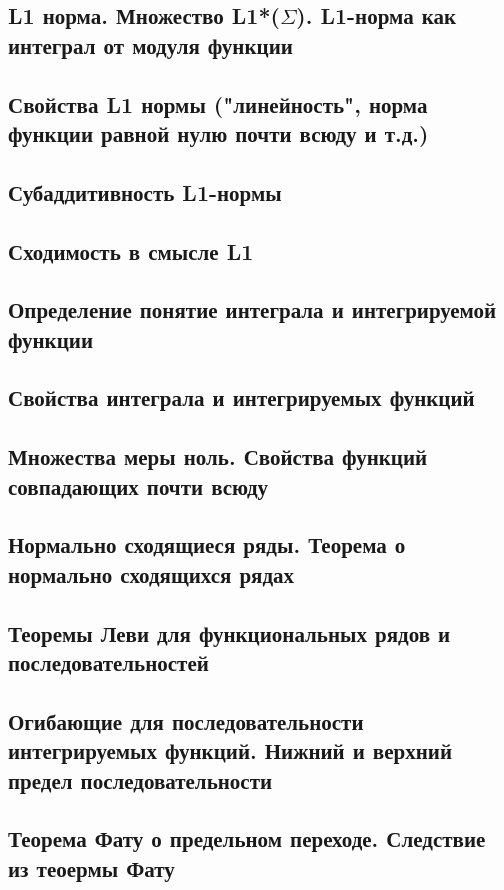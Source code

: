 \documentclass[a4paper]{article}
\theoremstyle{definition}
\theoremstyle{remark}
\begin{document}
    \subsection{ L1 норма. Множество L1*($\Sigma$). L1-норма как интеграл от модуля функции}
    \subsection{ Свойства L1 нормы ("линейность", норма функции равной нулю почти всюду и т.д.)}
    \subsection{ Субаддитивность L1-нормы}
    \subsection{ Сходимость в смысле L1}
    \subsection{ Определение понятие интеграла и интегрируемой функции}
    \subsection{ Свойства интеграла и интегрируемых функций}
    \subsection{ Множества меры ноль. Свойства функций совпадающих почти всюду}
    \subsection{ Нормально сходящиеся ряды. Теорема о нормально сходящихся рядах}
    \subsection{ Теоремы Леви для функциональных рядов и последовательностей}
    \subsection{ Огибающие для последовательности интегрируемых функций. Нижний и верхний предел последовательности}
    \subsection{ Теорема Фату о предельном переходе. Следствие из теоермы Фату}
\end{document}
